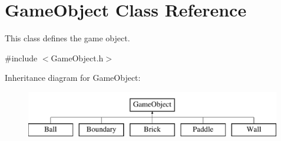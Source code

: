 \hypertarget{class_game_object}{}\section{Game\+Object Class Reference}
\label{class_game_object}


This class defines the game object.  




{\ttfamily \#include $<$Game\+Object.\+h$>$}

Inheritance diagram for Game\+Object\+:\begin{figure}[H]
\begin{center}
\leavevmode
\includegraphics[height=2.000000cm]{class_game_object}
\end{center}
\end{figure}
